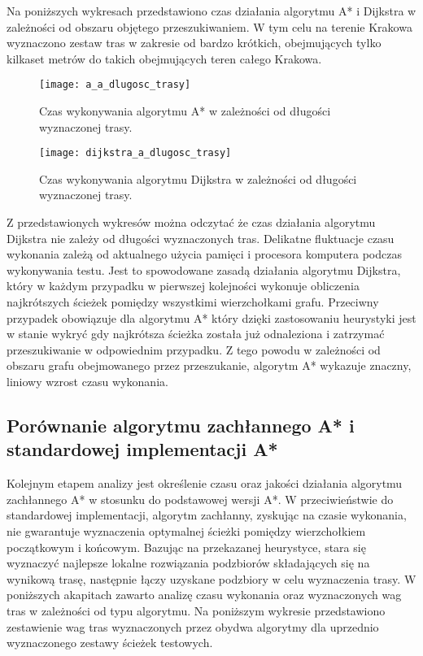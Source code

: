 Na poniższych wykresach przedstawiono czas działania algorytmu A* i Dijkstra w zależności od obszaru objętego przeszukiwaniem. W tym celu na terenie Krakowa wyznaczono zestaw tras w zakresie od bardzo krótkich, obejmujących tylko kilkaset metrów do takich obejmujących teren całego Krakowa.

\begin{figure}[H]
\centering
\texttt{[image: a\_a\_dlugosc\_trasy]}
\caption{Czas wykonywania algorytmu A* w zależności od długości wyznaczonej trasy.}
\end{figure}

\begin{figure}[H]
\centering
\texttt{[image: dijkstra\_a\_dlugosc\_trasy]}
\caption{Czas wykonywania algorytmu Dijkstra w zależności od długości wyznaczonej trasy.}
\end{figure}

Z przedstawionych wykresów można odczytać że czas działania algorytmu Dijkstra nie zależy od długości wyznaczonych tras. Delikatne fluktuacje czasu wykonania zależą od aktualnego użycia pamięci i procesora komputera podczas wykonywania testu. Jest to spowodowane zasadą działania algorytmu Dijkstra, który w każdym przypadku w pierwszej kolejności wykonuje obliczenia najkrótszych ścieżek pomiędzy wszystkimi wierzchołkami grafu.
Przeciwny przypadek obowiązuje dla algorytmu A* który dzięki zastosowaniu heurystyki jest w stanie wykryć gdy najkrótsza ścieżka została już odnaleziona i zatrzymać przeszukiwanie w odpowiednim przypadku. Z tego powodu w zależności od obszaru grafu obejmowanego przez przeszukanie, algorytm A* wykazuje znaczny, liniowy wzrost czasu wykonania.

\subsection{Porównanie algorytmu zachłannego A* i standardowej implementacji A*}

Kolejnym etapem analizy jest określenie czasu oraz jakości działania algorytmu zachłannego A* w stosunku do podstawowej wersji A*. W przeciwieństwie do standardowej implementacji, algorytm zachłanny, zyskując na czasie wykonania, nie gwarantuje wyznaczenia optymalnej ścieżki pomiędzy wierzchołkiem początkowym i końcowym. Bazując na przekazanej heurystyce, stara się wyznaczyć najlepsze lokalne rozwiązania podzbiorów składających się na wynikową trasę, następnie łączy uzyskane podzbiory w celu wyznaczenia trasy. W poniższych akapitach zawarto analizę czasu wykonania oraz wyznaczonych wag tras w zależności od typu algorytmu.
Na poniższym wykresie przedstawiono zestawienie wag tras wyznaczonych przez obydwa algorytmy dla uprzednio wyznaczonego zestawy ścieżek testowych.

